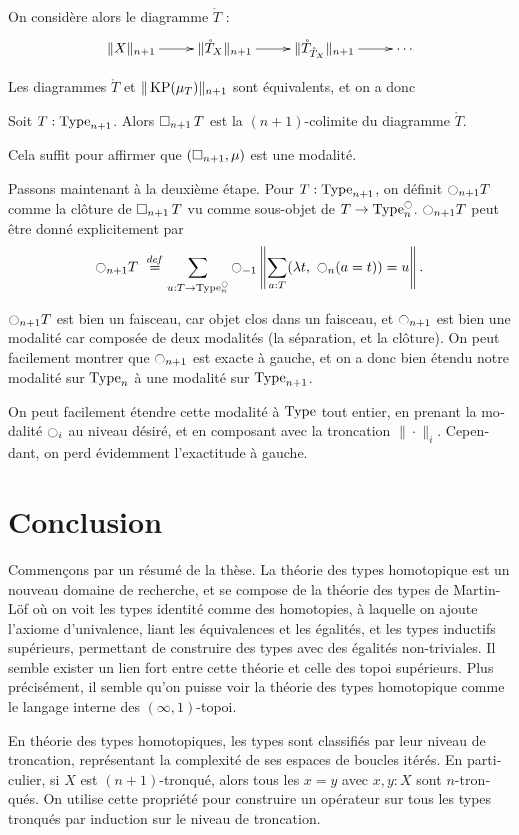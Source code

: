 \begin{otherlanguage}{french}
\begin{defifr}
  On considère alors le diagramme $\mathring T$ :
  \[\xymatrix{\|X\|_{n+1} \ar[r] & \|\mathring T_{X}\|_{n+1} \ar[r] & \|\mathring
  T_{\mathring T_X} \|_{n+1} \ar[r] & \cdots} \]%
\end{defifr}

Les diagrammes $\mathring T$ et $\|\operatorname{KP}(\mu_T)\|_{n+1}$ sont
équivalents, et on a donc
\begin{lemfr}
  Soit $T:\operatorname{Type}_{n+1}$. Alors $\mathop{\square_{n+1}} T$ est la $(n+1)$-colimite
  du diagramme $\mathring T$.
\end{lemfr}
Cela suffit pour affirmer que $(\mathop{\square_{n+1}},\mu)$ est une modalité.

Passons maintenant à la deuxième étape.
Pour $T:\operatorname{Type}_{n+1}$, on définit $\ocircle_{n+1}T$ comme la clôture de
$\mathop{\square_{n+1}} T$ vu comme sous-objet de $T\to\operatorname{Type}_n^{\ocircle}$.
$\ocircle_{n+1}T$ peut être donné explicitement par
\[
\ocircle_{n+1} T \ \overset{de\hspace{-0.2ex}f}{=} \sum_{u:T \to \operatorname{Type}_n^{\ocircle}} \ocircle_{-1}\left\| \sum_{a:T} 
            (\lambda t,~\ocircle_n (a=t)) = u\right\|.
\]%

$\ocircle_{n+1}T$ est bien un faisceau, car objet clos dans un
faisceau, et $\ocircle_{n+1}$ est bien une modalité car composée de deux
modalités (la séparation, et la clôture).
On peut facilement montrer que $\ocircle_{n+1}$ est exacte à gauche, et
on a donc bien étendu notre modalité sur $\operatorname{Type}_n$ à une modalité sur $\operatorname{Type}_{n+1}$.

On peut facilement étendre cette modalité à $\operatorname{Type}$ tout entier, en
prenant la modalité $\ocircle_i$ au niveau désiré, et en composant avec
la troncation $\|\cdot\|_i$. Cependant, on perd évidemment
l'exactitude à gauche.

\section{Conclusion}
Commençons par un résumé de la thèse. La théorie des types homotopique
est un nouveau domaine de recherche, et se compose de la théorie des
types de Martin-Löf où on voit les types identité comme des
homotopies, à laquelle on ajoute l'axiome d'univalence, liant les
équivalences et les égalités, et les types inductifs supérieurs,
permettant de construire des types avec des égalités non-triviales.
Il semble exister un lien fort entre cette théorie et celle des topoi
supérieurs. Plus précisément, il semble qu'on puisse voir la théorie
des types homotopique comme le langage interne des $(\infty,1)$-topoi.

En théorie des types homotopiques, les types sont classifiés par leur
niveau de troncation, représentant la complexité de ses espaces de
boucles itérés. En particulier, si $X$ est $(n+1)$-tronqué, alors tous
les $x=y$ avec $x,y:X$ sont $n$-tronqués. On utilise cette propriété
pour construire un opérateur sur tous les types tronqués par induction
sur le niveau de troncation.


\end{otherlanguage}
